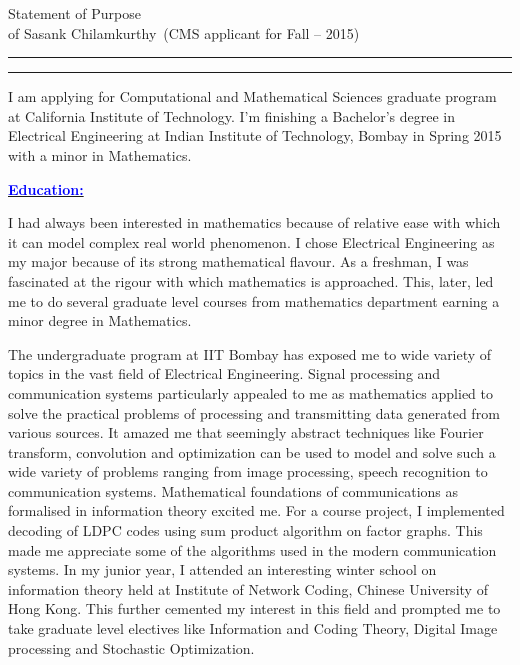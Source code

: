 \documentclass[11pt]{article}
\newcommand{\soptitle}{Statement of Purpose}
\newcommand{\yourname}{Sasank Chilamkurthy}
\newcommand{\statement}[1]{\par\medskip
  \underline{\textcolor{blue}{\textbf{#1:}}}\space
}
\begin{document}
\begin{center}
\LARGE\soptitle\\
\large of \yourname\ (CMS applicant for Fall -- 2015)
\end{center}

\hrule
\vspace{1pt}
\hrule height 1pt

\bigskip
I am applying for Computational and Mathematical Sciences graduate program at California Institute of Technology. 
I'm finishing a Bachelor's degree in Electrical Engineering at Indian Institute of Technology, Bombay in Spring 2015
with a minor in Mathematics.
\statement{Education}
I had always been interested in mathematics because of relative ease with which it can model complex real world phenomenon. 
I chose Electrical Engineering as my major because of its strong mathematical flavour. 
As a freshman, I was fascinated at the rigour with which mathematics is approached. 
This, later, led me to do several graduate level courses from mathematics department earning a minor degree in Mathematics. 

The undergraduate program at IIT Bombay has exposed me to wide variety of topics in the vast field of Electrical Engineering. 
Signal processing and communication systems particularly appealed to me as mathematics applied to solve the practical problems of processing and transmitting data generated from various sources. 
It amazed me that seemingly abstract techniques like Fourier transform, convolution and optimization can be used to model and solve such a wide variety of problems ranging from image processing, speech recognition to communication systems.
Mathematical foundations of communications as formalised in information theory excited me. 
For a course project, I implemented decoding of LDPC codes using sum product algorithm on factor graphs. 
This made me appreciate some of the algorithms used in the modern communication systems. 
In my junior year, I attended an interesting winter school on information theory held at Institute of Network Coding, Chinese University of Hong Kong. 
This further cemented my interest in this field and prompted me to take graduate level electives like Information and Coding Theory, Digital Image processing and Stochastic Optimization.
\end{document}
